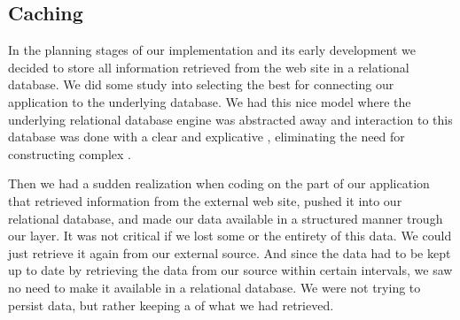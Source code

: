 \subsection{Caching}
\label{section:implementation.architecture.caching}

In the planning stages of our implementation and its early development we
decided to store all information retrieved from the \urort{} web site
in a relational database. We did some study into selecting the best
%
for connecting our application to the underlying database. We had this nice
model where the underlying relational database engine was abstracted away
and interaction to this database was done with a clear and explicative
,%
eliminating the need for constructing complex .%

Then we had a sudden realization when coding on the part of our application
that retrieved information from the external \urort{} web site, pushed it into
our relational database, and made our data available in a structured manner
trough our  layer. It was not critical if we lost some or the
entirety of this data. We could just retrieve it again from our external
source. And since the data had to be kept up to date by retrieving the data
from our source within certain intervals, we saw no need to make it available
in a relational database. We were not trying to persist data, but rather
keeping a %
of what we had retrieved.


